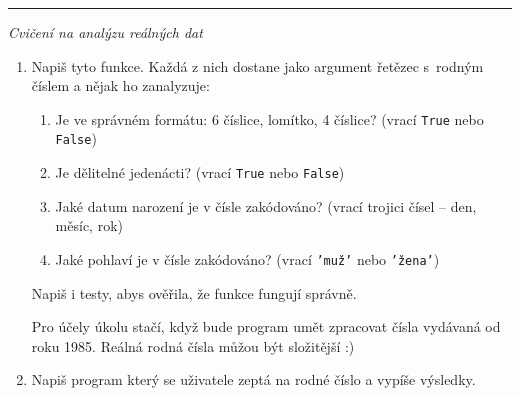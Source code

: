 \documentclass[a4paper,10pt]{article}
\newcommand\startsection[1]{
     \vspace{0.2ex}
    \hrule
    {\fontspec{Oxygen} \tiny
     \vspace{-1ex}
     \emph{#1}
     \vspace{-1.5em}
    }
}
\begin{document}

\startsection{Cvičení na analýzu reálných dat}

\begin{enumerate}[resume]

\item Napiš tyto funkce.
    Každá z nich dostane jako argument řetězec s~rodným číslem a nějak ho
    zanalyzuje:

    \begin{enumerate}

    \item Je ve správném formátu: 6 číslice, lomítko, 4 číslice?
        (vrací \texttt{True} nebo \texttt{False})
    \item Je dělitelné jedenácti?
        (vrací \texttt{True} nebo \texttt{False})
        \item Jaké datum narození je v čísle zakódováno?
        (vrací trojici čísel – den, měsíc, rok)
    \item Jaké pohlaví je v čísle zakódováno?
        (vrací \texttt{'muž'} nebo \texttt{'žena'})

    \end{enumerate}

    Napiš i testy, abys ověřila, že funkce fungují správně.

    Pro účely úkolu stačí, když bude program umět zpracovat čísla
    vydávaná od roku 1985. Reálná rodná čísla můžou být složitější :)

\item Napiš program který se uživatele zeptá na rodné číslo a vypíše výsledky.

\end{enumerate}
\end{document}
